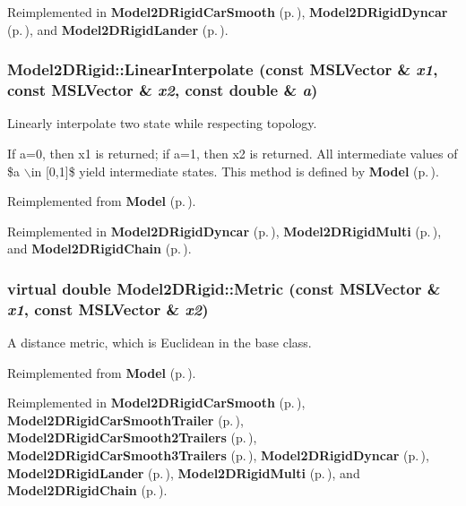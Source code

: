 Reimplemented in {\bf Model2DRigid\-Car\-Smooth} {\rm (p.\,\pageref{class_Model2DRigidCarSmooth_a3})}, {\bf Model2DRigid\-Dyncar} {\rm (p.\,\pageref{class_Model2DRigidDyncar_a2})}, and {\bf Model2DRigid\-Lander} {\rm (p.\,\pageref{class_Model2DRigidLander_a2})}.
\subsubsection{ Model2DRigid::Linear\-Interpolate (const {\bf MSLVector} \& {\em x1}, const {\bf MSLVector} \& {\em x2}, const double \& {\em a})\hspace{0.3cm}{\tt  [virtual]}}\label{class_Model2DRigid_a4}


Linearly interpolate two state while respecting topology.

If a=0, then x1 is returned; if a=1, then x2 is returned. All intermediate values of \$a $\backslash$in [0,1]\$ yield intermediate states. This method is defined by {\bf Model} {\rm (p.\,\pageref{class_Model})}. 

Reimplemented from {\bf Model} {\rm (p.\,\pageref{class_Model_a6})}.

Reimplemented in {\bf Model2DRigid\-Dyncar} {\rm (p.\,\pageref{class_Model2DRigidDyncar_a6})}, {\bf Model2DRigid\-Multi} {\rm (p.\,\pageref{class_Model2DRigidMulti_a4})}, and {\bf Model2DRigid\-Chain} {\rm (p.\,\pageref{class_Model2DRigidChain_a4})}.
\subsubsection{\setlength{\rightskip}{0pt plus 5cm}virtual double Model2DRigid::Metric (const {\bf MSLVector} \& {\em x1}, const {\bf MSLVector} \& {\em x2})\hspace{0.3cm}{\tt  [virtual]}}\label{class_Model2DRigid_a5}


A distance metric, which is Euclidean in the base class.



Reimplemented from {\bf Model} {\rm (p.\,\pageref{class_Model_a9})}.

Reimplemented in {\bf Model2DRigid\-Car\-Smooth} {\rm (p.\,\pageref{class_Model2DRigidCarSmooth_a4})}, {\bf Model2DRigid\-Car\-Smooth\-Trailer} {\rm (p.\,\pageref{class_Model2DRigidCarSmoothTrailer_a3})}, {\bf Model2DRigid\-Car\-Smooth2Trailers} {\rm (p.\,\pageref{class_Model2DRigidCarSmooth2Trailers_a3})}, {\bf Model2DRigid\-Car\-Smooth3Trailers} {\rm (p.\,\pageref{class_Model2DRigidCarSmooth3Trailers_a3})}, {\bf Model2DRigid\-Dyncar} {\rm (p.\,\pageref{class_Model2DRigidDyncar_a5})}, {\bf Model2DRigid\-Lander} {\rm (p.\,\pageref{class_Model2DRigidLander_a5})}, {\bf Model2DRigid\-Multi} {\rm (p.\,\pageref{class_Model2DRigidMulti_a2})}, and {\bf Model2DRigid\-Chain} {\rm (p.\,\pageref{class_Model2DRigidChain_a5})}.
